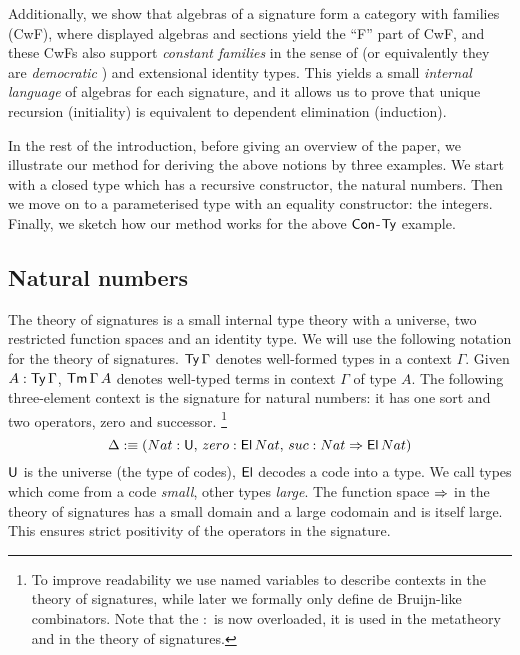 \documentclass[acmsmall,review,anonymous]{acmart}\settopmatter{printfolios=true,printccs=false,printacmref=false}
\begin{document}
Additionally, we show that algebras of a signature form a category
with families (CwF), where displayed algebras and sections yield the
``F'' part of CwF, and these CwFs also support \emph{constant
  families} in the sense of \cite[p.~74]{forsberg-phd} (or
equivalently they are \emph{democratic} \cite{clairambault2014biequivalence}) and extensional
identity types. This yields a small \emph{internal language} of
algebras for each signature, and it allows us to prove that unique
recursion (initiality) is equivalent to dependent elimination (induction).

In the rest of the introduction, before giving an overview of the
paper, we illustrate our method for deriving the above notions by
three examples. We start with a closed type which has a recursive
constructor, the natural numbers. Then we move on to a parameterised
type with an equality constructor: the integers. Finally, we sketch
how our method works for the above $\mathsf{Con}$-$\mathsf{Ty}$ example. %


\subsection{Natural numbers}
\label{sec:naturals}

The theory of signatures is a small internal type theory with a
universe, two restricted function spaces and an identity type. We will
use the following notation for the theory of signatures. $\mathsf{Ty}\,\Gamma$
denotes well-formed types in a context $\Gamma$. Given
$A:\mathsf{Ty}\,\Gamma$, $\mathsf{Tm}\,\Gamma\,A$ denotes well-typed terms in context
$\Gamma$ of type $A$. The following three-element context is the
signature for natural numbers: it has one sort and two operators, zero
and successor.
\footnote{To improve readability we use named variables to describe
  contexts in the theory of signatures, while later we formally only define
  de Bruijn-like combinators. Note that the $:$ is now overloaded, it
  is used in the metatheory and in the theory of signatures.}
\[
\Delta :\equiv (Nat:\mathsf{U},\,zero:\mathsf{El}\,Nat,\,suc:Nat\Rightarrow \mathsf{El}\,Nat)
\]
$\mathsf{U}$ is the universe (the type of codes), $\mathsf{El}$ decodes a code into a
type. We call types which come from a code {\em small}, other types
{\em large}. The function space $\Rightarrow$ in the theory of signatures
has a small domain and a large codomain and is itself large. This
ensures strict positivity of the operators in the signature.
\end{document}
